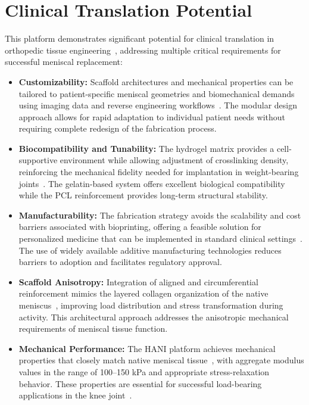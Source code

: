 \newpage
\section{Clinical Translation Potential}

This platform demonstrates significant potential for clinical translation in orthopedic tissue engineering~\cite{gupta2020meniscaltissue}, addressing multiple critical requirements for successful meniscal replacement:

\begin{itemize}
    \item \textbf{Customizability:} Scaffold architectures and mechanical properties can be tailored to patient-specific meniscal geometries and biomechanical demands using imaging data and reverse engineering workflows~\cite{filardo2019patientspecificmeniscus}. The modular design approach allows for rapid adaptation to individual patient needs without requiring complete redesign of the fabrication process.
    
    \item \textbf{Biocompatibility and Tunability:} The hydrogel matrix provides a cell-supportive environment while allowing adjustment of crosslinking density, reinforcing the mechanical fidelity needed for implantation in weight-bearing joints~\cite{bulle2021humanmeniscus}. The gelatin-based system offers excellent biological compatibility while the PCL reinforcement provides long-term structural stability.
    
    \item \textbf{Manufacturability:} The fabrication strategy avoids the scalability and cost barriers associated with bioprinting, offering a feasible solution for personalized medicine that can be implemented in standard clinical settings~\cite{ngo2018additivemanufacturing}. The use of widely available additive manufacturing technologies reduces barriers to adoption and facilitates regulatory approval.
    
    \item \textbf{Scaffold Anisotropy:} Integration of aligned and circumferential reinforcement mimics the layered collagen organization of the native meniscus~\cite{abdelgaied2015comparisonbiomechanical}, improving load distribution and stress transformation during activity. This architectural approach addresses the anisotropic mechanical requirements of meniscal tissue function.
    
    \item \textbf{Mechanical Performance:} The HANI platform achieves mechanical properties that closely match native meniscal tissue~\cite{bulle2021humanmeniscus}, with aggregate modulus values in the range of 100--150 kPa and appropriate stress-relaxation behavior. These properties are essential for successful load-bearing applications in the knee joint~\cite{makris2011kneemeniscus}.
\end{itemize}

